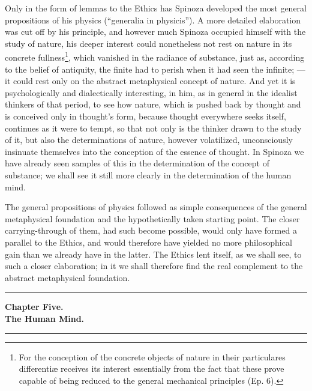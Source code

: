 \documentclass[12pt,a4paper,openany]{book}
\newcommand{\opage}[1]{\marginnote{\footnotesize\textit{[#1]}}}
\begin{document}
Only in the form of lemmas to the Ethics has Spinoza
developed the most general propositions of his physics (``generalia in
physicis''). A more detailed elaboration was cut off by his
principle, and however much Spinoza occupied himself with the study
of nature, his deeper interest could nonetheless not rest on
nature in its concrete fullness\footnote{For the conception of the
concrete objects of nature in their particulares differentiæ
receives its interest essentially from the fact that these prove capable of being
reduced to the general mechanical principles (Ep. 6).}, which
vanished in the radiance of substance, just as, according to the belief of antiquity, the
finite had to perish when it had seen the
infinite; --- it could rest only on the abstract
metaphysical concept of nature. And yet it is
\opage{82} psychologically and dialectically interesting, in him, as in general in the idealist thinkers of that period, to see how
nature, which is pushed back by thought and is conceived only in
thought's form, because thought everywhere seeks itself, continues
as it were to tempt, so that not only is the thinker drawn to
the study of it, but also the determinations of nature, however volatilized,
unconsciously insinuate themselves into the conception of the
essence of thought. In Spinoza we have already seen samples
of this in the determination of the concept of substance; we shall see it
still more clearly in the determination of the human mind.

The general propositions of physics followed as simple
consequences of the general metaphysical foundation and
the hypothetically taken starting point. The closer carrying-through
of them, had such become possible, would only
have formed a parallel to the Ethics, and would therefore have yielded no more
philosophical gain than we already have in the latter. The Ethics
lent itself, as we shall see, to such a closer elaboration;
in it we shall therefore find the real complement to the
abstract metaphysical foundation.

\bigskip
\begin{center}\rule{2.5cm}{0.4pt}\end{center}
\bigskip

\begin{center}
{\large\textbf{Chapter Five.}}\\[4pt]
\textbf{The Human Mind.}\\[6pt]
\rule{2cm}{0.4pt}
\end{center}
\bigskip
\end{document}

